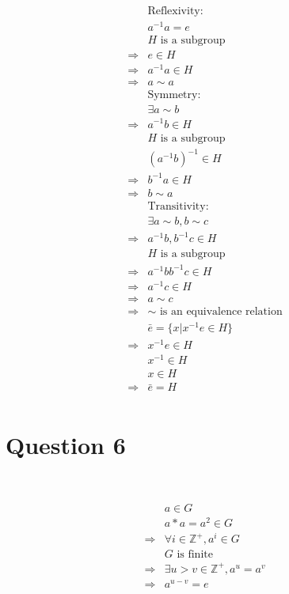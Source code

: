 \documentclass{article}
\begin{document}
\begin{equation*}
    \begin{split}
        &\text{Reflexivity}:\\
        &a^{-1}a=e\\
        &H\text{ is a subgroup}\\
        \Rightarrow&e\in H\\
        \Rightarrow&a^{-1}a\in H\\
        \Rightarrow&a\sim a\\
        &\text{Symmetry}:\\
        &\exists a\sim b\\
        \Rightarrow&a^{-1}b\in H\\
        &H\text{ is a subgroup}\\
        &(a^{-1}b)^{-1}\in H\\
        \Rightarrow&b^{-1}a\in H\\
        \Rightarrow&b\sim a\\
        &\text{Transitivity}:\\
        &\exists a\sim b,b\sim c\\
        \Rightarrow&a^{-1}b,b^{-1}c\in H\\
        &H\text{ is a subgroup}\\
        \Rightarrow&a^{-1}bb^{-1}c\in H\\
        \Rightarrow&a^{-1}c\in H\\
        \Rightarrow&a\sim c\\
        \Rightarrow&\sim \text{ is an equivalence relation}\\
        &\bar{e}=\{x|x^{-1}e\in H\}\\
        \Rightarrow&x^{-1}e\in H\\
        &x^{-1}\in H\\
        &x\in H\\
        \Rightarrow&\bar{e}=H\\
    \end{split}
\end{equation*}

\newpage

\section*{Question 6}

~

\begin{equation*}
    \begin{split}
        &a\in G\\
        &a\ast a=a^2\in G\\
        \Rightarrow&\forall i\in \mathbb{Z}^+, a^i\in G\\
        &G\text{ is finite}\\
        \Rightarrow&\exists u>v\in \mathbb{Z}^+,a^u=a^v\\
        \Rightarrow&a^{u-v}=e\\
    \end{split}
\end{equation*}
\end{document}
